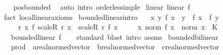 \begin{isabellebody}
%
\isadelimproof
\ \ %
\endisadelimproof
%
\isatagproof
{}\isamarkupfalse%
\ pos{\isacharunderscore}{\kern0pt}bounded\ \isamarkupfalse%
\ {\isacharparenleft}{\kern0pt}auto\ intro{\isacharcolon}{\kern0pt}\ order{\isacharunderscore}{\kern0pt}less{\isacharunderscore}{\kern0pt}imp{\isacharunderscore}{\kern0pt}le{\isacharparenright}{\kern0pt}%
\endisatagproof
{\isafoldproof}%
%
\isadelimproof
\isanewline
%
\endisadelimproof
\isanewline
{}\isamarkupfalse%
\ linear{\isacharcolon}{\kern0pt}\ {\isachardoublequoteopen}linear\ f{\isachardoublequoteclose}\isanewline
%
\isadelimproof
\ \ %
\endisadelimproof
%
\isatagproof
{}\isamarkupfalse%
\ {\isacharparenleft}{\kern0pt}fact\ local{\isachardot}{\kern0pt}linear{\isacharunderscore}{\kern0pt}axioms{\isacharparenright}{\kern0pt}%
\endisatagproof
{\isafoldproof}%
%
\isadelimproof
\isanewline
%
\endisadelimproof
\isanewline
{}\isamarkupfalse%
\isanewline
\isanewline
{}\isamarkupfalse%
\ bounded{\isacharunderscore}{\kern0pt}linear{\isacharunderscore}{\kern0pt}intro{\isacharcolon}{\kern0pt}\isanewline
\ \ \ {\isachardoublequoteopen}{\isasymAnd}x\ y{\isachardot}{\kern0pt}\ f\ {\isacharparenleft}{\kern0pt}x\ {\isacharplus}{\kern0pt}\ y{\isacharparenright}{\kern0pt}\ {\isacharequal}{\kern0pt}\ f\ x\ {\isacharplus}{\kern0pt}\ f\ y{\isachardoublequoteclose}\isanewline
\ \ \ \ \ {\isachardoublequoteopen}{\isasymAnd}r\ x{\isachardot}{\kern0pt}\ f\ {\isacharparenleft}{\kern0pt}scaleR\ r\ x{\isacharparenright}{\kern0pt}\ {\isacharequal}{\kern0pt}\ scaleR\ r\ {\isacharparenleft}{\kern0pt}f\ x{\isacharparenright}{\kern0pt}{\isachardoublequoteclose}\isanewline
\ \ \ \ \ {\isachardoublequoteopen}{\isasymAnd}x{\isachardot}{\kern0pt}\ norm\ {\isacharparenleft}{\kern0pt}f\ x{\isacharparenright}{\kern0pt}\ {\isasymle}\ norm\ x\ {\isacharasterisk}{\kern0pt}\ K{\isachardoublequoteclose}\isanewline
\ \ \ {\isachardoublequoteopen}bounded{\isacharunderscore}{\kern0pt}linear\ f{\isachardoublequoteclose}\isanewline
%
\isadelimproof
\ \ %
\endisadelimproof
%
\isatagproof
{}\isamarkupfalse%
\ standard\ {\isacharparenleft}{\kern0pt}blast\ intro{\isacharcolon}{\kern0pt}\ assms{\isacharparenright}{\kern0pt}{\isacharplus}{\kern0pt}%
\endisatagproof
{\isafoldproof}%
%
\isadelimproof
\isanewline
%
\endisadelimproof
\isanewline
{}\isamarkupfalse%
\ bounded{\isacharunderscore}{\kern0pt}bilinear\ {\isacharequal}{\kern0pt}\isanewline
\ \ \ prod\ {\isacharcolon}{\kern0pt}{\isacharcolon}{\kern0pt}\ {\isachardoublequoteopen}{\isacharprime}{\kern0pt}a{\isacharcolon}{\kern0pt}{\isacharcolon}{\kern0pt}real{\isacharunderscore}{\kern0pt}normed{\isacharunderscore}{\kern0pt}vector\ {\isasymRightarrow}\ {\isacharprime}{\kern0pt}b{\isacharcolon}{\kern0pt}{\isacharcolon}{\kern0pt}real{\isacharunderscore}{\kern0pt}normed{\isacharunderscore}{\kern0pt}vector\ {\isasymRightarrow}\ {\isacharprime}{\kern0pt}c{\isacharcolon}{\kern0pt}{\isacharcolon}{\kern0pt}real{\isacharunderscore}{\kern0pt}normed{\isacharunderscore}{\kern0pt}vector{\isachardoublequoteclose}\isanewline

\end{isabellebody}
